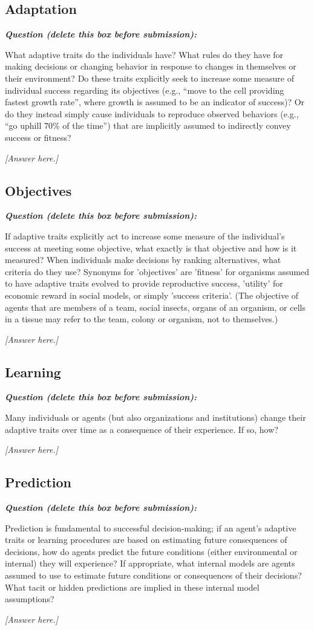\documentclass[11pt,a4paper]{article}
\newenvironment{question}
  {\begin{oddquestion}\small\itshape\color{oddquestioncolor}%
   \textbf{Question (delete this box before submission):}\par\smallskip}
  {\end{oddquestion}}
\begin{document}
\subsection{Adaptation}
\begin{question}
What adaptive traits do the individuals have? What rules do they have
for making decisions or changing behavior in response to changes in
themselves or their environment? Do these traits explicitly seek to
increase some measure of individual success regarding its objectives
(e.g., ``move to the cell providing fastest growth rate'', where growth
is assumed to be an indicator of success)? Or do they instead simply
cause individuals to reproduce observed behaviors (e.g., ``go uphill
70\% of the time'') that are implicitly assumed to indirectly convey
success or fitness?
\end{question}
\textit{[Answer here.]}

\subsection{Objectives}
\begin{question}
If adaptive traits explicitly act to increase some measure of the
individual's success at meeting some objective, what exactly is that
objective and how is it measured? When individuals make decisions by
ranking alternatives, what criteria do they use? Synonyms for
'objectives' are 'fitness' for organisms assumed to have adaptive traits
evolved to provide reproductive success, 'utility' for economic reward
in social models, or simply 'success criteria'. (The objective of agents
that are members of a team, social insects, organs of an organism, or
cells in a tissue may refer to the team, colony or organism, not to
themselves.)
\end{question}
\textit{[Answer here.]}

\subsection{Learning}
\begin{question}
Many individuals or agents (but also organizations and institutions)
change their adaptive traits over time as a consequence of their
experience. If so, how?
\end{question}
\textit{[Answer here.]}

\subsection{Prediction}
\begin{question}
Prediction is fundamental to successful decision-making; if an agent's
adaptive traits or learning procedures are based on estimating future
consequences of decisions, how do agents predict the future conditions
(either environmental or internal) they will experience? If appropriate,
what internal models are agents assumed to use to estimate future
conditions or consequences of their decisions? What tacit or hidden
predictions are implied in these internal model assumptions?
\end{question}
\textit{[Answer here.]}
\end{document}
